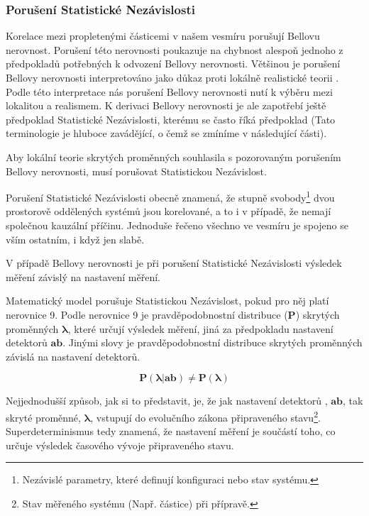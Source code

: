 \clearpage

\subsubsection{Porušení Statistické Nezávislosti}
Korelace mezi propletenými částicemi v našem vesmíru porušují Bellovu nerovnost. Porušení této nerovnosti poukazuje na chybnost alespoň jednoho z předpokladů potřebných k odvození Bellovy nerovnosti. Většinou je porušení Bellovy nerovnosti interpretováno jako důkaz proti lokálně realistické teorii \parencite{belltest:violation}. Podle této interpretace nás porušení Bellovy nerovnosti nutí k výběru mezi lokalitou a realismem. K derivaci Bellovy nerovnosti je ale zapotřebí ještě předpoklad Statistické Nezávislosti, kterému se často říká předpoklad  (Tato terminologie je hluboce zavádějící, o čemž se zmíníme v následující části).

Aby lokální teorie skrytých proměnných souhlasila s pozorovaným porušením Bellovy nerovnosti, musí porušovat Statistickou Nezávislost.

Porušení Statistické Nezávislosti obecně znamená, že stupně svobody\footnote[10]{Nezávislé parametry, které definují konfiguraci nebo stav systému.} dvou prostorově oddělených systémů jsou korelované, a to i v případě, že nemají společnou kauzální příčinu. Jednoduše řečeno všechno ve vesmíru je spojeno se vším ostatním, i když jen slabě. 

V případě Bellovy nerovnosti je při porušení Statistické Nezávislosti výsledek měření závislý na nastavení měření. 

Matematický model porušuje Statistickou Nezávislost, pokud pro něj platí nerovnice 9. Podle nerovnice 9 je pravděpodobnostní distribuce ($\bm{P}$) skrytých proměnných $\bm{\lambda}$, které určují výsledek měření, jiná za předpokladu nastavení detektorů $\bm{ab}$. Jinými slovy je pravděpodobnostní distribuce skrytých proměnných závislá na nastavení detektorů.

\begin{equation}
    \bm{P(\lambda|ab) \neq P(\lambda)}
    \label{eq:9}
\end{equation}

Nejjednodušší způsob, jak si to představit, je, že jak nastavení detektorů , $\bm{ab}$, tak skryté proměnné, $\bm{\lambda}$, vstupují do evolučního zákona připraveného stavu\footnote[11]{Stav měřeného systému (Např. částice) při přípravě.}. Superdeterminismus tedy znamená, že nastavení měření je součástí toho, co určuje výsledek časového vývoje připraveného stavu.

